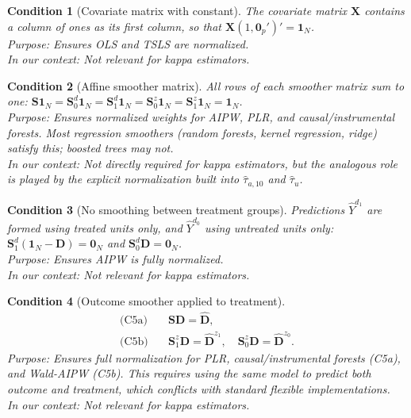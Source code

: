 \documentclass[12pt, a4paper]{article}
\theoremstyle{condstyle}
\newtheorem{condition}{Condition}[section]
\theoremstyle{plain}
\newcommand{\bone}{\mathbf{1}_N}
\newcommand{\bzero}{\mathbf{0}_N}
\newcommand{\that}[1]{\hat{\tau}_{#1}}
\begin{document}
\begin{condition}[Covariate matrix with constant]\label{cond:constant}
  The covariate matrix $\mathbf{X}$ contains a column of ones as its first column,
  so that $\mathbf{X}(1, \mathbf{0}_p')' = \bone$.\\
  \textit{Purpose:} Ensures OLS and TSLS are normalized.\\
  \textit{In our context:} Not relevant for kappa estimators.
\end{condition}

\begin{condition}[Affine smoother matrix]\label{cond:affine}
  All rows of each smoother matrix sum to one:
  $\mathbf{S}\bone = \mathbf{S}^d_0\bone = \mathbf{S}^d_1\bone =
   \mathbf{S}^z_0\bone = \mathbf{S}^z_1\bone = \bone$.\\
  \textit{Purpose:} Ensures normalized weights for AIPW, PLR, and causal/instrumental forests.
  Most regression smoothers (random forests, kernel regression, ridge) satisfy this;
  boosted trees may not.\\
  \textit{In our context:} Not directly required for kappa estimators,
  but the analogous role is played by the explicit normalization built into
  $\that{a,10}$ and $\that{u}$.
\end{condition}

\begin{condition}[No smoothing between treatment groups]\label{cond:nosmoothbetween}
  Predictions $\hat{Y}^{d_1}$ are formed using treated units only,
  and $\hat{Y}^{d_0}$ using untreated units only:
  $\mathbf{S}^d_1(\bone - \mathbf{D}) = \bzero$ and $\mathbf{S}^d_0\mathbf{D} = \bzero$.\\
  \textit{Purpose:} Ensures AIPW is fully normalized.\\
  \textit{In our context:} Not relevant for kappa estimators.
\end{condition}

\begin{condition}[Outcome smoother applied to treatment]\label{cond:same_smoother}
  \begin{align*}
    \text{(C5a)} &\quad \mathbf{S}\mathbf{D} = \hat{\mathbf{D}},\\
    \text{(C5b)} &\quad \mathbf{S}^z_1\mathbf{D} = \hat{\mathbf{D}}^{z_1},\quad
                          \mathbf{S}^z_0\mathbf{D} = \hat{\mathbf{D}}^{z_0}.
  \end{align*}
  \textit{Purpose:} Ensures full normalization for PLR, causal/instrumental forests (C5a),
  and Wald-AIPW (C5b).
  This requires using the \emph{same} model to predict both outcome and treatment,
  which conflicts with standard flexible implementations.\\
  \textit{In our context:} Not relevant for kappa estimators.
\end{condition}
\end{document}

